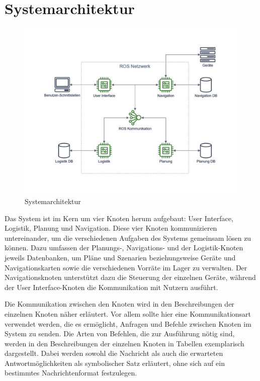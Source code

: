 \FloatBarrier
\newpage \section{Systemarchitektur}

\begin{figure}[h]
\centering
\includegraphics[width=\textwidth]{Bilder/3_ROS_Netzwerk.jpg}
\caption{Systemarchitektur}
\end{figure}

Das System ist im Kern um vier Knoten herum aufgebaut: User Interface, Logistik, Planung und Navigation. Diese vier Knoten kommunizieren untereinander, um die verschiedenen Aufgaben des Systems gemeinsam lösen zu können. Dazu umfassen der Planungs-, Navigations- und der Logistik-Knoten jeweils Datenbanken, um Pläne und Szenarien beziehungsweise Geräte und Navigationskarten sowie die verschiedenen Vorräte im Lager zu verwalten. Der Navigationsknoten unterstützt dazu die Steuerung der einzelnen Geräte, während der User Interface-Knoten die Kommunikation mit Nutzern ausführt.

Die Kommunikation zwischen den Knoten wird in den Beschreibungen der einzelnen Knoten näher erläutert. Vor allem sollte hier eine Kommunikationsart verwendet werden, die es ermöglicht, Anfragen und Befehle zwischen Knoten im System zu senden. Die Arten von Befehlen, die zur Ausführung nötig sind, werden in den Beschreibungen der einzelnen Knoten in Tabellen exemplarisch dargestellt. Dabei werden sowohl die Nachricht als auch die erwarteten Antwortmöglichkeiten als symbolischer Satz erläutert, ohne sich auf ein bestimmtes Nachrichtenformat festzulegen.


